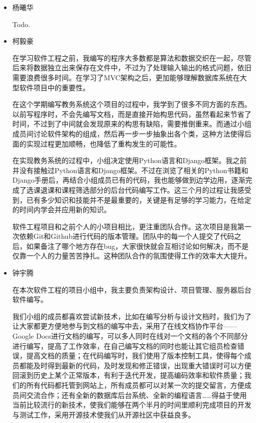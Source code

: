 \begin{itemize}
  \item 杨曦华
  
  \CJKindent Todo.
  
  \item 柯毅豪
  
  \CJKindent 在学习软件工程之前，我编写的程序大多数都是算法和数据交织在一起，尽管后来将数据独立出来保存在文件中，不过为了处理输入输出的格式问题，依旧需要浪费很多时间。在学习了MVC架构之后，更加能够理解数据库系统在大型软件项目中的重要性。
  
  \CJKindent 在这个学期编写教务系统这个项目的过程中，我学到了很多不同方面的东西。以前写程序时，不会先编写文档，而是直接开始构思代码，虽然看起来节省了时间，不过到了中间就会发现原来的构思有缺陷，需要推倒重来。而通过小组成员间讨论软件架构的组成，然后再一步一步抽象出各个类，这种方法使得后面的实现过程更加顺畅，也降低了重构发生的可能性。
  
  \CJKindent 在实现教务系统的过程中，小组决定使用Python语言和Django框架。我之前并没有接触过Python语言和Django框架。不过在浏览了相关的Python书籍和Django手册后，再结合小组成员已有的代码，我也能够做到边学边用，逐渐完成了选课退课和课程筛选部分的后台代码编写工作。这三个月的过程让我感受到，已有多少知识和技能并不是最重要的，关键是有足够的学习能力，在给定的时间内学会并应用新的知识。
  
  \CJKindent 软件工程项目和之前个人的小项目相比，更注重团队合作。这次项目是我第一次依赖Git和Github进行代码的版本管理。团队中的每一个人提交了代码之后，如果备注了哪个地方存在bug，大家很快就会互相讨论如何解决，而不是仅靠一个人的力量苦苦挣扎。这种团队合作的氛围使得工作的效率大大提升。
  
  \item 钟宇腾
  
  \CJKindent 在本次软件工程的项目小组中，我主要负责架构设计、项目管理、服务器后台软件编写。
  
  \CJKindent 我们小组的成员都喜欢尝试新技术，比如在编写分析与设计文档时，我们为了让大家都更方便地参与到文档的编写中去，采用了在线文档协作平台—— Google Docs进行文档的编写，可以多人同时在线对一个文档的各个不同部分进行编写，提高了工作效率，在自己编写文档的同时也能让其它组员检查错误，提高文档的质量；在代码编写时，我们使用了版本控制工具，使得每个成员都能及时得到最新的代码，及时发现和修正错误，出现重大错误时可以方便回滚到历史上某个正常版本，有利于迭代开发，提高编码效率和软件质量；我们的所有代码都托管到网站上，所有成员都可以对某一次的提交留言，方便成员间交流合作；还有全新的数据库后台系统、全新的编程语言……得益于使用当前比较流行的新技术，使我们能够在两个半月的时间里顺利完成项目的开发与测试工作，采用开源技术使我们从开源社区中获益良多。
  

\end{itemize}
